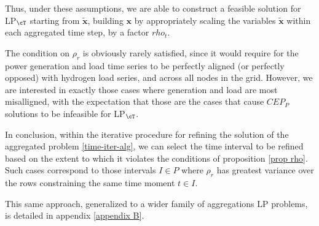 Thus, under these assumptions, we are able to construct a feasible solution for LP$_{\cT}$ starting from $\tilde{\mathbf{x}}$, building $\mathbf{x}$ by appropriately scaling the variables  $\tilde{\mathbf{x}}$ within each aggregated time step, by a factor $rho_t$.


The condition on $\rho_r$ is obviously rarely satisfied, since it would require for the power generation and load time series to be perfectly aligned (or perfectly opposed) with hydrogen load series, and across all nodes in the grid.
However, we are interested in exactly those cases where generation and load are most misalligned, with the expectation that those are the cases that cause $CEP_P$ solutions to be infeasible for LP$_{\cT}$.

In conclusion, within the iterative procedure for refining the solution of the aggregated problem \ref{time-iter-alg}, we can select the time interval to be refined based on the extent to which it violates the conditions of proposition \ref{prop rho}.
Such cases correspond to those intervals $I\in P$ where $\rho_r$ has greatest variance over the rows constraining the same time moment $t\in I$. 

This same approach, generalized to a wider family of aggregations LP problems, is detailed in appendix \ref{appendix B}.

























